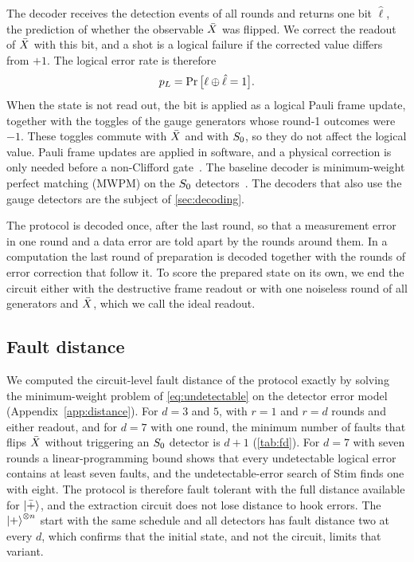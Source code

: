 The decoder receives the detection events of all rounds and returns one bit $\hat\ell$, the prediction of whether the observable $\bar{X}$ was flipped. We correct the readout of $\bar{X}$ with this bit, and a shot is a logical failure if the corrected value differs from $+1$. The logical error rate is therefore
\begin{equation}
  p_L=\Pr\big[\ell\oplus\hat\ell=1\big].
  \label{eq:pL}
\end{equation}
When the state is not read out, the bit is applied as a logical Pauli frame update, together with the toggles of the gauge generators whose round-1 outcomes were $-1$. These toggles commute with $\bar{X}$ and with $S_0$, so they do not affect the logical value. Pauli frame updates are applied in software, and a physical correction is only needed before a non-Clifford gate~\cite{knill2005,gottesman1998}. The baseline decoder is minimum-weight perfect matching (MWPM) on the $S_0$ detectors~\cite{dennis2002,higgott2025sparse}. The decoders that also use the gauge detectors are the subject of \autoref{sec:decoding}.

The protocol is decoded once, after the last round, so that a measurement error in one round and a data error are told apart by the rounds around them. In a computation the last round of preparation is decoded together with the rounds of error correction that follow it. To score the prepared state on its own, we end the circuit either with the destructive frame readout or with one noiseless round of all generators and $\bar{X}$, which we call the ideal readout.

\subsection{Fault distance}
\label{sec:fd}

We computed the circuit-level fault distance of the protocol exactly by solving the minimum-weight problem of \autoref{eq:undetectable} on the detector error model (Appendix~\ref{app:distance}). For $d=3$ and $5$, with $r=1$ and $r=d$ rounds and either readout, and for $d=7$ with one round, the minimum number of faults that flips $\bar{X}$ without triggering an $S_0$ detector is $d+1$ (\autoref{tab:fd}). For $d=7$ with seven rounds a linear-programming bound shows that every undetectable logical error contains at least seven faults, and the undetectable-error search of Stim finds one with eight. The protocol is therefore fault tolerant with the full distance available for $\left|\bar{+}\right\rangle$, and the extraction circuit does not lose distance to hook errors. The $\left|+\right\rangle^{\otimes n}$ start with the same schedule and all detectors has fault distance two at every $d$, which confirms that the initial state, and not the circuit, limits that variant.


